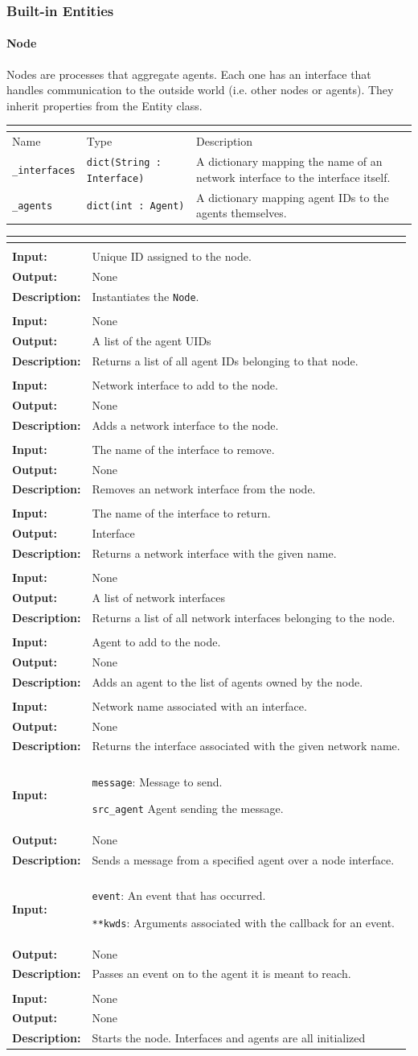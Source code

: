 \documentclass[titlepage]{article}
\renewenvironment{itemize*}
    {\begin{itemize}
        \setlength{\itemsep}{0pt}%
        \setlength{\parskip}{0pt}%
        \setlength{\partopsep}{0pt}%
        \setlength{\topsep}{0pt}}%
    {\end{itemize}}
\newcommand{\operations}[1]{
\begin{center}
    \begin{longtable}{|p{4cm}|p{10cm + 2.0\tabcolsep}|}
    \hline
    \multicolumn{2}{|l|}{\cellcolor[gray]{0.5}{\textbf{Operations}}} \\ \hline
#1
    \end{longtable}
\end{center}
}
\newcommand{\operation}[4]{
    \hline
    \multicolumn{2}{|l|}{\cellcolor[gray]{0.8}{\texttt{#1}}} \\ \hline
    \hspace{7pt}\textbf{Input:} & #2 \\ \hline
    \hspace{7pt}\textbf{Output:} & #3 \\ \hline
    \hspace{7pt}\textbf{Description:} & #4 \\ \hline
}
\newcommand{\attributes}[1]{
    \begin{center}
        \begin{tabular}{|p{3cm}|p{3cm}|p{8cm}|}
            \multicolumn{3}{|l|}{\cellcolor[gray]{0.5}{\textbf{Attributes}}} \\ \hline
            \rowcolor[gray]{0.8} Name & Type & Description \\ \hline 
            #1
        \end{tabular}
    \end{center}
}
\newcommand{\attribute}[3]{
    \texttt{#1} & \texttt{#2} & #3 \\ \hline
}
\begin{document}
\subsubsection{Built-in Entities}
\paragraph{Node}{Nodes are processes that aggregate agents. Each one has an interface that handles communication to the outside world (i.e. other nodes or agents). They inherit properties from the Entity class.}

\attributes{
    \attribute{\_interfaces}{dict(String : Interface)}{A dictionary mapping the name of an network interface to the interface itself. }
    \attribute{\_agents}{dict(int : Agent)}{A dictionary mapping agent IDs to the agents themselves.}
}

\operations{
    \operation{\_\_init\_\_(uid)}{Unique ID assigned to the node.}{None}{Instantiates the \texttt{Node}.}
    \operation{get\_agent\_uids()}{None}{A list of the agent UIDs}{Returns a list of all agent IDs belonging to that node.}
    \operation{add\_interface(interface)}{Network interface to add to the node.}{None}{Adds a network interface to the node.}
    \operation{remove\_interface(name)}{The name of the interface to remove.}{None}{Removes an network interface from the node.}
    \operation{get\_interface(name)}{The name of the interface to return.}{Interface}{Returns a network interface with the given name.}
    \operation{get\_interfaces()}{None}{A list of network interfaces}{Returns a list of all network interfaces belonging to the node.}
    \operation{add\_agent(agent\_inst)}{Agent to add to the node.}{None}{Adds an agent to the list of agents owned by the node.}
    \operation{get\_interface\_on\_net(network\_name)}{Network name associated with an interface.}{None}{Returns the interface associated with the given network name.}
    \operation{send(message,src\_agent)}
    {
        \begin{itemize*}
            \item \texttt{message}: Message to send. 
            \item \texttt{src\_agent} Agent sending the message.
        \end{itemize*}
    }{None}{Sends a message from a specified agent over a node interface.}
    \operation{\_on\_message(event,**kwds)}
    {
        \begin{itemize*}
            \item \texttt{event}: An event that has occurred. 
            \item \texttt{**kwds}: Arguments associated with the callback for an event.
        \end{itemize*}
    }{None}{Passes an event on to the agent it is meant to reach.}
    \operation{run()}{None}{None}{Starts the node. Interfaces and agents are all initialized}
}
\end{document}
